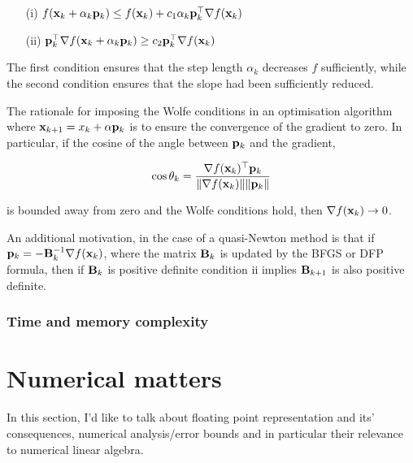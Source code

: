 \documentclass{amsart}[12pt]
\begin{document}
\begin{enumerate}
\item[(i)] $f({\bf x}_k + \alpha_k {\bf p}_k) \leq f({\bf x}_k) + c_1 \alpha_k {\bf p}_k^\top \nabla f({\bf x}_k)$ 
\item[(ii)] ${\bf p}_k^\top \nabla f({\bf x}_k + \alpha_k {\bf p}_k) \geq c_2 {\bf p}_k^\top \nabla f({\bf x}_k)$ 
\end{enumerate}

The first condition ensures that the step length $\alpha_k$ decreases $f$ sufficiently, while the second condition
ensures that the slope had been sufficiently reduced.

The rationale for imposing the Wolfe conditions in an optimisation algorithm where
${\bf x}_{k+1} = x_k + \alpha {\bf p}_k$ is to ensure the convergence of the gradient to zero. In particular, if the
cosine of the angle between ${\bf p}_k$ and the gradient,

$$
\cos \theta_k = \frac{\nabla f({\bf x}_k)^\top {\bf p}_k}{\|\nabla f({\bf x}_k)\| \|{\bf p}_k\|}
$$

is bounded away from zero and the Wolfe conditions hold, then $\nabla f({\bf x}_k) \to 0$.

An additional motivation, in the case of a quasi-Newton method is that if ${\bf p}_k = - {\bf B}_k^{-1} \nabla f({\bf x}_k)$,
where the matrix ${\bf B}_k$ is updated by the BFGS or DFP formula, then if ${\bf B}_k$ is positive definite condition ii
implies ${\bf B}_{k+1}$ is also positive definite.

\subsubsection{Time and memory complexity}

\section{Numerical matters}

In this section, I'd like to talk about floating point representation and its' consequences, numerical
analysis/error bounds and in particular their relevance to numerical linear algebra.



\end{document}
